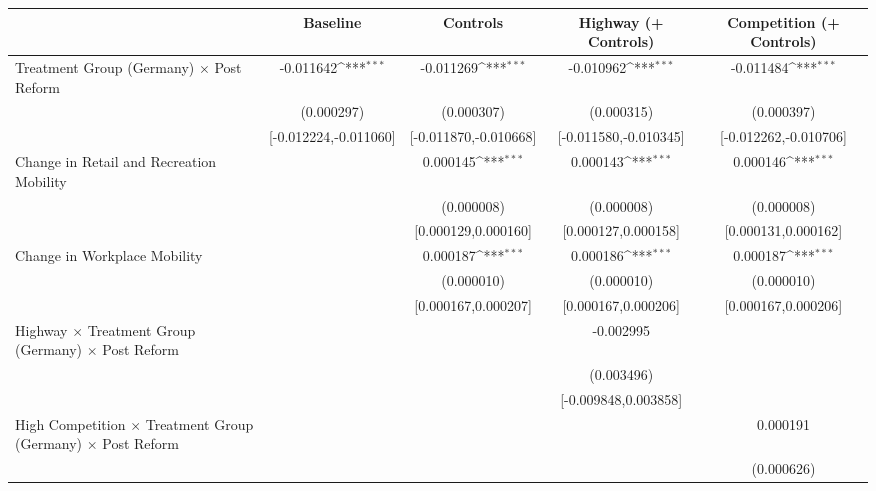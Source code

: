 {
\def\sym#1{\ifmmode^{#1}\else\(^{#1}\)\fi}
\begin{tabular}{l*{4}{c}}
\toprule
                    &\multicolumn{1}{c}{Baseline}&\multicolumn{1}{c}{Controls}&\multicolumn{1}{c}{Highway (+ Controls)}&\multicolumn{1}{c}{Competition (+ Controls)}\\
\midrule
Treatment Group (Germany) $\times$ Post Reform&   -0.011642\sym{***}&   -0.011269\sym{***}&   -0.010962\sym{***}&   -0.011484\sym{***}\\
                    &  (0.000297)         &  (0.000307)         &  (0.000315)         &  (0.000397)         \\
                    &[-0.012224,-0.011060]         &[-0.011870,-0.010668]         &[-0.011580,-0.010345]         &[-0.012262,-0.010706]         \\
Change in Retail and Recreation Mobility&                     &    0.000145\sym{***}&    0.000143\sym{***}&    0.000146\sym{***}\\
                    &                     &  (0.000008)         &  (0.000008)         &  (0.000008)         \\
                    &                     &[0.000129,0.000160]         &[0.000127,0.000158]         &[0.000131,0.000162]         \\
Change in Workplace Mobility&                     &    0.000187\sym{***}&    0.000186\sym{***}&    0.000187\sym{***}\\
                    &                     &  (0.000010)         &  (0.000010)         &  (0.000010)         \\
                    &                     &[0.000167,0.000207]         &[0.000167,0.000206]         &[0.000167,0.000206]         \\
Highway $\times$ Treatment Group (Germany) $\times$ Post Reform&                     &                     &   -0.002995         &                     \\
                    &                     &                     &  (0.003496)         &                     \\
                    &                     &                     &[-0.009848,0.003858]         &                     \\
High Competition $\times$ Treatment Group (Germany) $\times$ Post Reform&                     &                     &                     &    0.000191         \\
                    &                     &                     &                     &  (0.000626)         \\

\end{tabular}}
